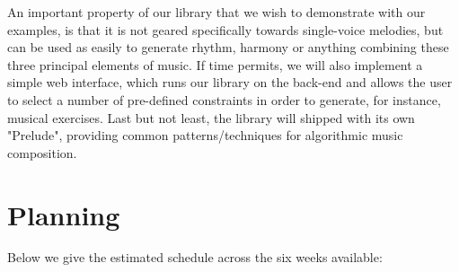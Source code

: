 \documentclass[12pt,a4paper]{article}
\begin{document}
An important property of our library that we wish to demonstrate with our examples, is that it is not geared specifically towards single-voice melodies, but can be used as easily to generate rhythm, harmony or anything combining these three principal elements of music.
If time permits, we will also implement a simple web interface, which runs our library on the back-end and allows the user to select a number of pre-defined constraints in order to generate, for instance, musical exercises.
Last but not least, the library will shipped with its own "Prelude", providing common patterns/techniques for algorithmic music composition.


\section{Planning}
Below we give the estimated schedule across the six weeks available:
\vspace{.5cm}

\startchronology
{}
\stopchronology
\vspace{.5cm}



\end{document}
